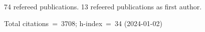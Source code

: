 74 refereed publications. 13 refeered publications as first author.

Total citations~=~3708; h-index~=~34 (2024-01-02)